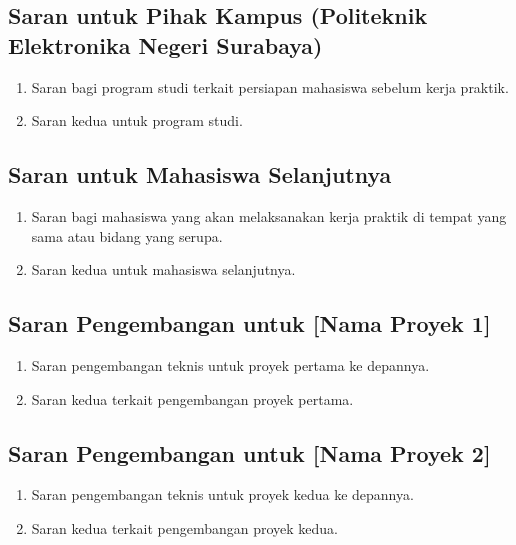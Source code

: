 \subsection{Saran untuk Pihak Kampus (Politeknik Elektronika Negeri Surabaya)}

\begin{enumerate}[label=\arabic*., leftmargin=*, itemsep=0pt]
  \item Saran bagi program studi terkait persiapan mahasiswa sebelum kerja praktik.
  \item Saran kedua untuk program studi.
\end{enumerate}

\subsection{Saran untuk Mahasiswa Selanjutnya}

\begin{enumerate}[label=\arabic*., leftmargin=*, itemsep=0pt]
  \item Saran bagi mahasiswa yang akan melaksanakan kerja praktik di tempat
        yang sama atau bidang yang serupa.
  \item Saran kedua untuk mahasiswa selanjutnya.
\end{enumerate}

\subsection{Saran Pengembangan untuk [Nama Proyek 1]}

\begin{enumerate}[label=\arabic*., leftmargin=*, itemsep=0pt]
  \item Saran pengembangan teknis untuk proyek pertama ke depannya.
  \item Saran kedua terkait pengembangan proyek pertama.
\end{enumerate}

\subsection{Saran Pengembangan untuk [Nama Proyek 2]}

\begin{enumerate}[label=\arabic*., leftmargin=*, itemsep=0pt]
  \item Saran pengembangan teknis untuk proyek kedua ke depannya.
  \item Saran kedua terkait pengembangan proyek kedua.
\end{enumerate}
